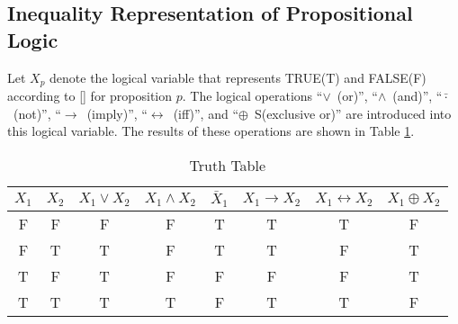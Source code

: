 \documentclass[]{interact}
\theoremstyle{plain}%
\theoremstyle{definition}
\theoremstyle{remark}
\begin{document}
\subsection{Inequality Representation of Propositional Logic}
Let $X_p$ denote the logical variable that represents TRUE(T) and FALSE(F) according to [] for proposition $p$. 
The logical operations ``$\vee$~(or)'', ``$\wedge$~(and)'', ``$\bar{\cdot}$~(not)'', ``$\rightarrow$~(imply)'', ``$\leftrightarrow$~(iff)'', and ``$\oplus$~S(exclusive or)'' are introduced into this logical variable. 
The results of these operations are shown in Table \ref{table:Truth Table}.
\begin{table}[hbtp]
    \caption{Truth Table}
    \label{table:Truth Table}
    \centering
    \begin{tabular}{|c|c||c|c|c|c|c|c|}
      \hline
      $X_1$ & $X_2$ & $X_1\vee X_2$ & $X_1\wedge X_2$ & $\bar{X}_1$ & $X_1\rightarrow X_2$ & $X_1\leftrightarrow X_2$ & $X_1\oplus X_2$ \\
      \hline \hline
        F  & F  & F & F & T & T & T & F\\
        F  & T  & T & F & T & T & F & T\\
        T  & F  & T & F & F & F & F & T\\
        T  & T  & T & T & F & T & T & F\\
      \hline
    \end{tabular}
\end{table}
\end{document}
